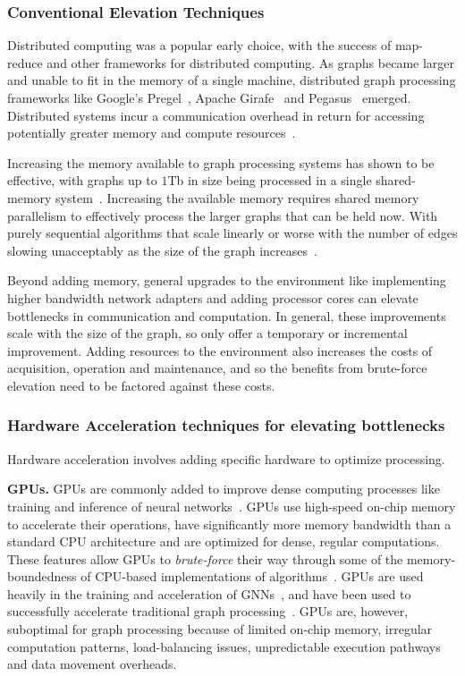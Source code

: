 \subsubsection{Conventional Elevation Techniques}
Distributed computing was a popular early choice, with the success of map-reduce and other frameworks for distributed computing. 
As graphs became larger and unable to fit in the memory of a single machine, distributed graph processing frameworks like Google's Pregel~\cite{Malewicz2010}, Apache Girafe~\cite{Sakr2016} and Pegasus~\cite{Kang2009} emerged. 
Distributed systems incur a communication overhead in return for accessing potentially greater memory and compute resources~\cite{Shun2013, Beamer2015}.

Increasing the memory available to graph processing systems has shown to be effective, with graphs up to $1$Tb in size being processed in a single shared-memory system~\cite{Dhulipala2021}.
Increasing the available memory requires shared memory parallelism to effectively process the larger graphs that can be held now.
With purely sequential algorithms that scale linearly or worse with the number of edges slowing unacceptably as the size of the graph increases~\cite{Hong2012}.

Beyond adding memory, general upgrades to the environment like implementing higher bandwidth network adapters and adding processor cores can elevate bottlenecks in communication and computation.
In general, these improvements scale with the size of the graph, so only offer a temporary or incremental improvement. 
Adding resources to the environment also increases the costs of acquisition, operation and maintenance, and so the benefits from brute-force elevation need to be factored against these costs. 

\subsubsection{Hardware Acceleration techniques for elevating bottlenecks}
Hardware acceleration involves adding specific hardware to optimize processing. 

\textbf{GPUs.}
GPUs are commonly added to improve dense computing processes like training and inference of neural networks~\cite{Dally2021}.
GPUs use high-speed on-chip memory to accelerate their operations, have significantly more memory bandwidth than a standard CPU architecture and are optimized for dense, regular computations. 
These features allow GPUs to \textit{brute-force} their way through some of the memory-boundedness of CPU-based implementations of algorithms~\cite{Aananthakrishnan2020}.
GPUs are used heavily in the training and acceleration of GNNs~\cite{Wu2021a, Baruah2021, Zhang2023}, and have been used to successfully accelerate traditional graph processing~\cite{Fu2014, Wang2016}.
GPUs are, however, suboptimal for graph processing because of limited on-chip memory, irregular computation patterns, load-balancing issues, unpredictable execution pathways and data movement overheads.

